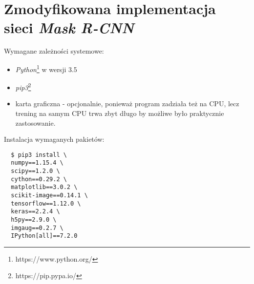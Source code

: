 \section*{Zmodyfikowana implementacja sieci \textit{Mask R-CNN}}

Wymagane zależności systemowe:

\begin{itemize}
  \item \textit{Python}\footnote{https://www.python.org/} w wersji 3.5
  \item \textit{pip3}\footnote{https://pip.pypa.io/}
  \item karta graficzna - opcjonalnie, ponieważ program zadziała też na CPU, lecz trening na samym CPU trwa zbyt długo by możliwe było praktycznie zastosowanie.
\end{itemize}

Instalacja wymaganych pakietów:

\begin{verbatim}
  $ pip3 install \
  numpy==1.15.4 \
  scipy==1.2.0 \
  cython==0.29.2 \
  matplotlib==3.0.2 \
  scikit-image==0.14.1 \
  tensorflow==1.12.0 \
  keras==2.2.4 \
  h5py==2.9.0 \
  imgaug==0.2.7 \
  IPython[all]==7.2.0
\end{verbatim}